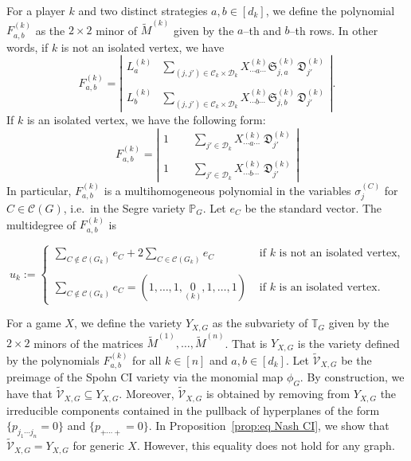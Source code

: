 \documentclass[11pt]{amsart}
\numberwithin{equation}{section}
\theoremstyle{plain}
\numberwithin{theorem}{section}
\theoremstyle{definition}
\begin{document}
\noindent For a player $k$ and two distinct strategies $a,b\in[d_k]$, we define the polynomial $F_{a,b}^{(k)}$ as the $2\times 2$ minor of $\widetilde{M}^{(k)}$ given by the $a$--th and $b$--th rows. In other words, if $k$ is not an isolated vertex, we have
\[
F_{a,b}^{(k)}=\left|\begin{array}{cc}
    \displaystyle L_a^{(k)}&\displaystyle\sum_{(j,j')\in\mathscr C_k\times\mathscr D_k}X_{\cdots a\cdots}^{(k)}\mathfrak S_{j,a}^{(k)}\,\mathfrak D_{j'}^{(k)}\\
    &\\
    \displaystyle L_b^{(k)}&\displaystyle\sum_{(j,j')\in\mathscr C_k\times\mathscr D_k}X_{\cdots b\cdots}^{(k)}\mathfrak S_{j,b}^{(k)}\,\mathfrak D_{j'}^{(k)}
\end{array}\right|.
\]
If $k$ is an isolated vertex, we have the following form: 
\[
F_{a,b}^{(k)}=\left|\begin{array}{cc}
   1~~~~~~&\displaystyle\sum_{j'\in\mathscr D_k}X_{\cdots a\cdots}^{(k)}\,\mathfrak D_{j'}^{(k)}\\
    &\\
   1~~~~~~&\displaystyle\sum_{j'\in\mathscr D_k}X_{\cdots b\cdots}^{(k)}\,\mathfrak D_{j'}^{(k)}
\end{array}\right|
\]
In particular, $F_{a,b}^{(k)}$ is a multihomogeneous polynomial in the variables $\sigma_j^{(C)}$ for $C\in \mathcal{C}(G)$, i.e.\ in the Segre variety $\mathbb{P}_G$. Let $e_C$ be the standard vector. The multidegree of $F_{a,b}^{(k)}$  is 

\[u_k:=\left\{\begin{array}{cl}
\displaystyle\sum_{C\not\in \mathcal{C}(G_k)} e_C + 2\sum_{C\in \mathcal{C}(G_k)} e_C & \text{ if }k\text{ is not an isolated vertex,}\\ & \\
\displaystyle\sum_{C\not\in \mathcal{C}(G_k)} e_C = (1,\ldots,1,\underset{(k)}{0},1,\ldots,1)&
\text{ if }k\text{ is an isolated vertex.}
\end{array}\right.\] 

\noindent For a game $X$, we define the variety $Y_{X,G}$ as the subvariety of $\mathbb{T}_G$ given by the $2\times 2$ minors of the matrices $\widetilde{M}^{(1)},\ldots,\widetilde{M}^{(n)}$. That is $Y_{X,G}$ is the variety defined by the polynomials $F^{(k)}_{a,b}$ for all $k\in[n]$ and $a,b\in[d_k]$.
Let $\widetilde{\mathcal{V}}_{X,G}$ be the preimage of the Spohn CI variety via the monomial map $\phi_G$. By construction, we have that $\widetilde{\mathcal{V}}_{X,G}\subseteq Y_{X,G}$. Moreover, $\widetilde{\mathcal{V}}_{X,G}$ is obtained by removing from $ Y_{X,G}$ the irreducible components contained in the pullback of hyperplanes of the form $\{p_{j_1\cdots j_n}=0\}$ and $\{p_{+\cdots +}=0\}$. In Proposition~\ref{prop:eq Nash CI}, we show that $\widetilde{\mathcal{V}}_{X,G}= Y_{X,G}$ for generic $X$. However, this equality does not hold for any graph.
\end{document}
